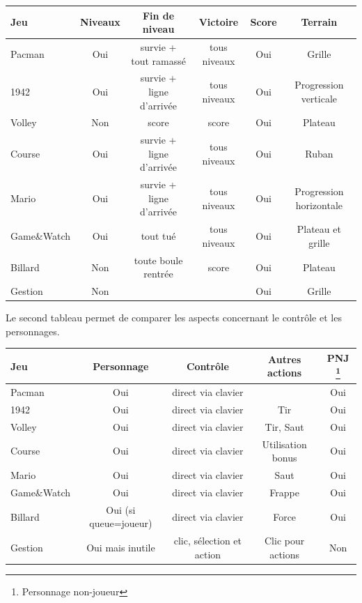 \vspace{0.5cm}
\noindent
\begin{tabular}{|l|| c|c|c|c|c|}
\hline
 Jeu &  Niveaux & Fin de niveau & Victoire & Score & Terrain \\
\hline
 Pacman & Oui & survie + tout ramassé & tous niveaux & Oui & Grille \\
\hline
 1942 & Oui & survie + ligne d'arrivée & tous niveaux & Oui & Progression verticale \\
\hline
 Volley &  Non & score & score & Oui & Plateau \\
\hline
 Course & Oui & survie + ligne d'arrivée & tous niveaux & Oui & Ruban \\
\hline
 Mario & Oui & survie + ligne d'arrivée & tous niveaux & Oui & Progression horizontale\\
\hline
 Game\&Watch & Oui & tout tué & tous niveaux & Oui  & Plateau et grille\\
\hline
 Billard & Non & toute boule rentrée & score & Oui & Plateau \\
\hline
 Gestion & Non & & & Oui & Grille\\
\hline
\end{tabular}

\vspace{0.5cm}

Le second tableau permet de comparer les aspects concernant le contrôle et les personnages.

\vspace{0.5cm}
\noindent
\begin{tabular}{|l|| c|c|c|c|}
\hline
 Jeu & Personnage & Contrôle & Autres actions & PNJ \footnote{Personnage non-joueur} \\
\hline
 Pacman &  Oui & direct via clavier & &  Oui \\
\hline
 1942 & Oui & direct via clavier & Tir & Oui  \\
\hline
 Volley & Oui & direct via clavier  & Tir, Saut & Oui \\
\hline
 Course & Oui & direct via clavier & Utilisation bonus & Oui \\
\hline
 Mario & Oui & direct via clavier &  Saut & Oui \\
\hline
 Game\&Watch & Oui & direct via clavier & Frappe & Oui  \\
\hline 
 Billard &  Oui {\small (si queue=joueur)} & direct via clavier & Force & Oui  \\
\hline
 Gestion &  Oui mais inutile & clic, sélection et action & Clic pour actions & Non \\
\hline
\end{tabular}

